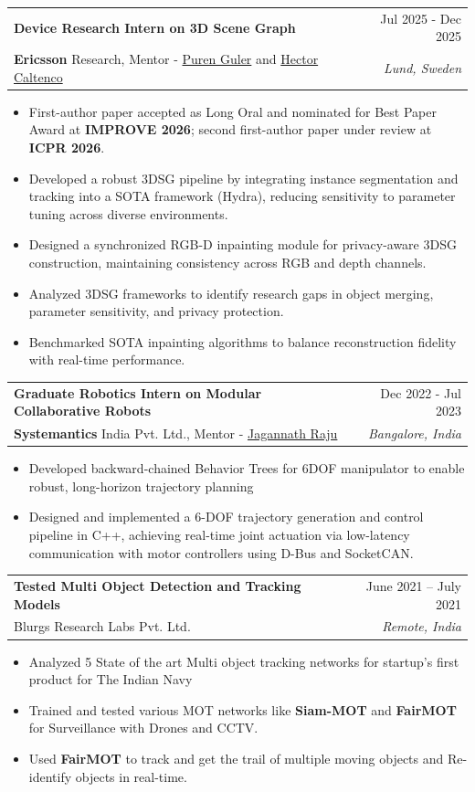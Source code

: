 \documentclass[letterpaper, 11pt]{article}
\makeatletter
\newcommand{\resumeItem}[1]{ \item\small{ {#1 \vspace{-2pt}} } }
\newcommand{\resumeSubheading}[4]{
\vspace{-1pt}
\item
\begin{tabular*}{1.0\textwidth}[t]{l@{\extracolsep{\fill}}r}
	\textbf{#1}       & {\small #2} \\
	{\small#3} & \textit{\small #4} \\
\end{tabular*}
\vspace{-10pt}
}
\newcommand{\resumeItemListStart}{\begin{itemize}[leftmargin=0.25in]}
\newcommand{\resumeItemListEnd}{\end{itemize}
\vspace{-5pt}}
\makeatother
\begin{document}
    \resumeSubheading{Device Research Intern on 3D Scene Graph}{Jul 2025 - Dec 2025}{\textbf{Ericsson} Research, Mentor - 
    \href{https://se.linkedin.com/in/p\%C3\%BCren-g\%C3\%BCler-76457317}{{Puren Guler}} and 
    \href{https://se.linkedin.com/in/hcaltenco}{Hector Caltenco}}{Lund, Sweden} 
    \resumeItemListStart 
    \resumeItem{First-author paper accepted as Long Oral and nominated for Best Paper Award at \textbf{IMPROVE 2026}; second first-author paper under review at \textbf{ICPR 2026}.}
    \resumeItem{Developed a robust 3DSG pipeline by integrating instance segmentation and tracking into a SOTA framework (Hydra), reducing sensitivity to parameter tuning across diverse environments.}
    \resumeItem{Designed a synchronized RGB-D inpainting module for privacy-aware 3DSG construction, maintaining consistency across RGB and depth channels.}
    \resumeItem{Analyzed 3DSG frameworks to identify research gaps in object merging, parameter sensitivity, and privacy protection.}
    \resumeItem{Benchmarked SOTA inpainting algorithms to balance reconstruction fidelity with real-time performance.}
\resumeItemListEnd

    \resumeSubheading{Graduate Robotics Intern on Modular Collaborative Robots}{Dec 2022 - Jul 2023}{\textbf{Systemantics} India Pvt. Ltd., Mentor - \href{https://www.linkedin.com/in/jagannathraju/}{{Jagannath Raju}}}{Bangalore, India}
    \resumeItemListStart 
        \resumeItem{Developed backward-chained Behavior Trees for 6DOF manipulator to enable robust, long-horizon trajectory planning}
        \resumeItem{Designed and implemented a 6-DOF trajectory generation and control pipeline in C++, achieving real-time joint actuation via low-latency communication with motor controllers using D-Bus and SocketCAN.}
    \resumeItemListEnd
    \newpage
    \resumeSubheading{Tested Multi Object Detection and Tracking Models}{June 2021 -- July 2021}{Blurgs Research Labs Pvt. Ltd.}{Remote, India} 
    \resumeItemListStart 
        \resumeItem{Analyzed 5 State of the art Multi object tracking networks for startup's first product for The Indian Navy}
        \resumeItem{Trained and tested various MOT networks like \textbf{Siam-MOT} and \textbf{FairMOT} for Surveillance with Drones and CCTV.}
        \resumeItem{Used \textbf{FairMOT} to track and get the trail of multiple moving objects and Re-identify objects in real-time.}
    \resumeItemListEnd
\end{document}
